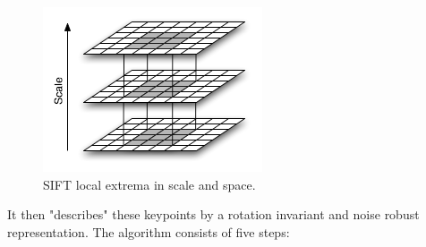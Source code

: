 \begin{figure}
    \centering
    \includegraphics[width=.5\linewidth,keepaspectratio]{figures/registration/sift/sift_extrema.png}
    \caption{SIFT local extrema in scale and space.}
    \label{fig:sift_extrema}
\end{figure}

%
It then "describes" these keypoints by a rotation invariant and noise robust representation.
%
The algorithm consists of five steps:
